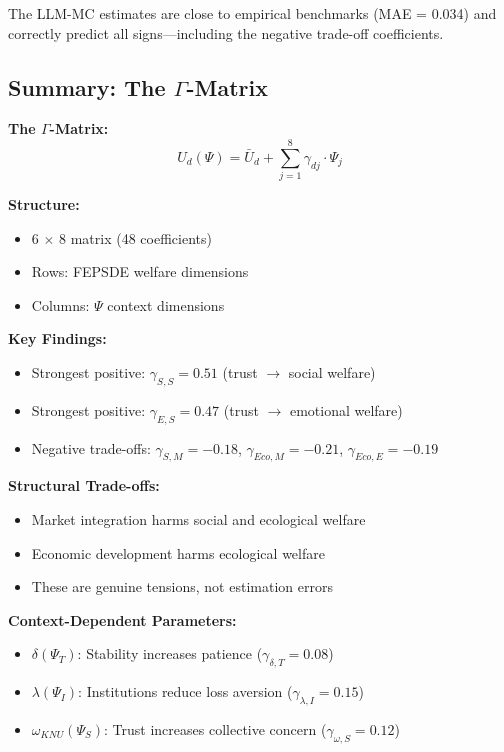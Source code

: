 The LLM-MC estimates are close to empirical benchmarks (MAE = 0.034) and 
correctly predict all signs---including the negative trade-off coefficients.

\subsection{Summary: The $\Gamma$-Matrix}

\begin{tcolorbox}[colback=gray!5!white, colframe=gray!75!black, title=Section C.7 Summary]
\textbf{The $\Gamma$-Matrix:}
$$U_d(\Psi) = \bar{U}_d + \sum_{j=1}^{8} \gamma_{dj} \cdot \Psi_j$$

\textbf{Structure:}
\begin{itemize}
\item 6 $\times$ 8 matrix (48 coefficients)
\item Rows: FEPSDE welfare dimensions
\item Columns: $\Psi$ context dimensions
\end{itemize}

\textbf{Key Findings:}
\begin{itemize}
\item Strongest positive: $\gamma_{S,S} = 0.51$ (trust $\rightarrow$ social welfare)
\item Strongest positive: $\gamma_{E,S} = 0.47$ (trust $\rightarrow$ emotional welfare)
\item Negative trade-offs: $\gamma_{S,M} = -0.18$, $\gamma_{Eco,M} = -0.21$, $\gamma_{Eco,E} = -0.19$
\end{itemize}

\textbf{Structural Trade-offs:}
\begin{itemize}
\item Market integration harms social and ecological welfare
\item Economic development harms ecological welfare
\item These are genuine tensions, not estimation errors
\end{itemize}

\textbf{Context-Dependent Parameters:}
\begin{itemize}
\item $\delta(\Psi_T)$: Stability increases patience ($\gamma_{\delta,T} = 0.08$)
\item $\lambda(\Psi_I)$: Institutions reduce loss aversion ($\gamma_{\lambda,I} = 0.15$)
\item $\omega_{KNU}(\Psi_S)$: Trust increases collective concern ($\gamma_{\omega,S} = 0.12$)
\end{itemize}


\end{tcolorbox}

